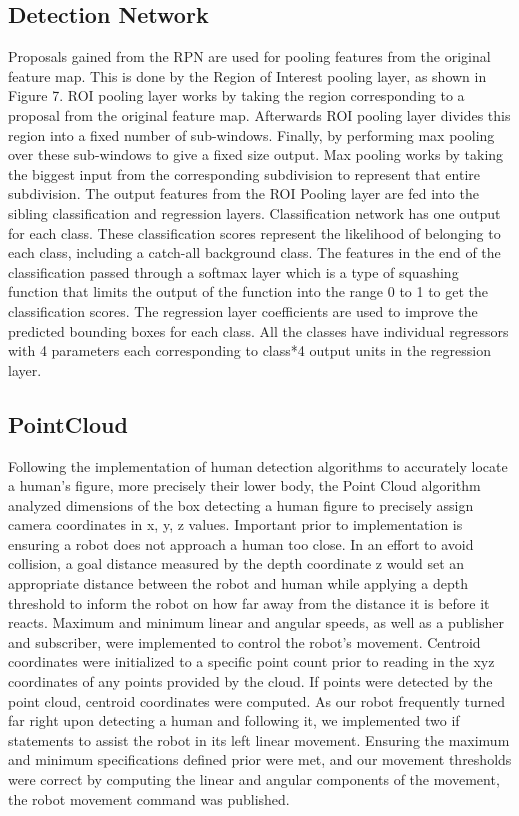 \documentclass{ndjflart}
\theoremstyle{definition}
\theoremstyle{remark}
\begin{document}
\subsection{Detection Network}\label{ssecnotes}
Proposals gained from the RPN are used for pooling features from the original feature map. This is done by the Region of Interest pooling layer, as shown in Figure 7. ROI pooling layer works by taking the region corresponding to a proposal from the original feature map. Afterwards ROI pooling layer divides this region into a fixed number of sub-windows. Finally, by performing max pooling over these sub-windows to give a fixed size output. Max pooling works by taking the biggest input from the corresponding subdivision to represent that entire subdivision. The output features from the ROI Pooling layer are fed into the sibling classification and regression layers. Classification network has one output for each class. These classification scores represent the likelihood of belonging to each class, including a catch-all background class. The features in the end of the classification passed through a softmax layer which is a type of squashing function that limits the output of the function into the range 0 to 1 to get the classification scores. The regression layer coefficients are used to improve the predicted bounding boxes for each class. All the classes have individual regressors with 4 parameters each corresponding to class*4 output units in the regression layer.

\subsection{PointCloud}\label{ssecnotes}
Following the implementation of human detection algorithms to accurately locate a human's figure, more precisely their lower body, the Point Cloud algorithm analyzed dimensions of the box detecting a human figure to precisely assign camera coordinates in x, y, z values. Important prior to implementation is ensuring a robot does not approach a human too close. In an effort to avoid collision, a goal distance measured by the depth coordinate z would set an appropriate distance between the robot and human while applying a depth threshold to inform the robot on how far away from the distance it is before it reacts. Maximum and minimum linear and angular speeds, as well as a publisher and subscriber, were implemented to control the robot's movement. Centroid coordinates were initialized to a specific point count prior to reading in the xyz coordinates of any points provided by the cloud. If points were detected by the point cloud, centroid coordinates were computed. As our robot frequently turned far right upon detecting a human and following it, we implemented two if statements to assist the robot in its left linear movement. Ensuring the maximum and minimum specifications defined prior were met, and our movement thresholds were correct by computing the linear and angular components of the movement, the robot movement command was published. 
\end{document}
